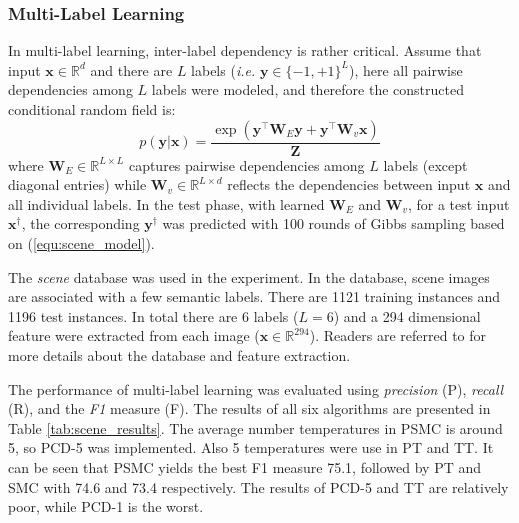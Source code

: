 \subsubsection{Multi-Label Learning}
In multi-label learning, inter-label dependency is rather critical. Assume that input $\mathbf{x}\in \mathbb{R}^d$ and there are $L$ labels (\emph{i.e.} $\mathbf{y}\in\{-1,+1\}^L$), here all pairwise 
dependencies among $L$ labels were modeled, and therefore 
the constructed conditional random field is:
\begin{equation}
	p(\mathbf{y}|\mathbf{x})=\frac{\exp(\mathbf{y}^\top\mathbf{W}_E \mathbf{y}+\mathbf{y}^\top \mathbf{W}_v \mathbf{x})}{\mathbf{Z}}
	\label{equ:scene_model}
\end{equation}
where $\mathbf{W}_E\in \mathbb{R}^{L\times L}$ captures pairwise dependencies among $L$ labels (except diagonal entries) while $\mathbf{W}_v\in \mathbb{R}^{L\times d}$ reflects the 
dependencies between input $\mathbf{x}$ and all individual labels.   
In the test phase, with learned $\mathbf{W}_E$ and $\mathbf{W}_v$, for a test input $\mathbf{x}^\dagger$, the corresponding $\mathbf{y}^\dagger$ was predicted with 
100 rounds of Gibbs sampling based on (\ref{equ:scene_model}).  

The \emph{scene} database \citep{scene_database} was used in the experiment.  In the database, scene images are associated with a few semantic labels.
There are 1121 training instances and 1196 test instances.  In total there are 6 labels ($L=6$) and a 294 dimensional feature were extracted from each image         
($\mathbf{x}\in\mathbb{R}^{294}$). Readers are referred to \cite{scene_database} for more details about the database and feature extraction.  

The performance of multi-label learning was evaluated using \emph{precision} (P), \emph{recall} (R), and the \emph{F1} measure (F). 
The results of all six algorithms are presented in Table \ref{tab:scene_results}.     
The average number temperatures in PSMC is around 5, so PCD-5 was implemented. Also 5 temperatures were use in PT and TT.    
It can be seen that PSMC yields the best F1 measure 75.1, followed by PT and SMC with 74.6 and 73.4 respectively. The results of PCD-5 and TT             
are relatively poor, while PCD-1 is the worst.  


